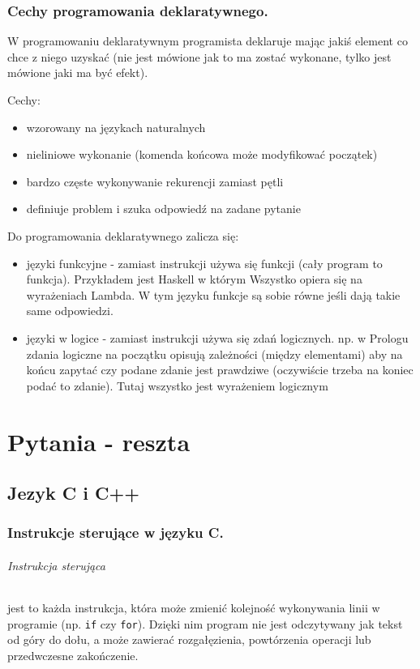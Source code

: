 \documentclass[a4paper,12pt,oneside]{book}
\begin{document}
			\newpage\subsection{Cechy programowania deklaratywnego.}
				W programowaniu deklaratywnym programista deklaruje mając jakiś element co chce z
				niego uzyskać (nie jest mówione jak to ma zostać wykonane, tylko jest mówione jaki ma być
				efekt).
				
				Cechy:
				\begin{itemize}
					\item wzorowany na językach naturalnych
					\item nieliniowe wykonanie (komenda końcowa może modyfikować początek)
					\item bardzo częste wykonywanie rekurencji zamiast pętli
					\item definiuje problem i szuka odpowiedź na zadane pytanie
				\end{itemize}
			
				Do programowania deklaratywnego zalicza się:
				\begin{itemize}
					\item języki funkcyjne - zamiast instrukcji używa się funkcji (cały program to funkcja).
					Przykładem jest Haskell w którym Wszystko opiera się na wyrażeniach Lambda. W
					tym języku funkcje są sobie równe jeśli dają takie same odpowiedzi.
					\item języki w logice - zamiast instrukcji używa się zdań logicznych. np. w Prologu zdania
					logiczne na początku opisują zależności (między elementami) aby na końcu zapytać
					czy podane zdanie jest prawdziwe (oczywiście trzeba na koniec podać to zdanie).
					Tutaj wszystko jest wyrażeniem logicznym
				\end{itemize}
	
	\chapter{Pytania - reszta}
	
		\section{Jezyk C i C++}
			\subsection{Instrukcje sterujące w języku C.}
				\subparagraph{Instrukcja sterująca}jest to każda instrukcja, która może zmienić kolejność wykonywania linii w programie (np.  \verb*|if| czy  \verb*|for|). Dzięki nim program nie jest odczytywany jak tekst od góry do dołu, a może zawierać rozgałęzienia, powtórzenia operacji lub przedwczesne zakończenie.\\
				
\end{document}
